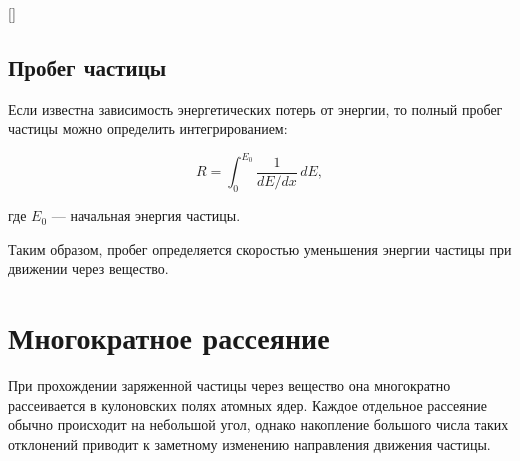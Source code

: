 \documentclass[../final.tex]{subfiles}
\begin{document}
\begin{rbox}[left=18pt,right=18pt,top=14pt,bottom=10pt]{[]}

    \captionsetup{
        font=footnotesize,
        labelfont=bf,
        skip=5pt
    }

    \label{fig:ionization_losses_particles}
\end{rbox}


\subsection{Пробег частицы}

Если известна зависимость энергетических потерь от энергии,
то полный пробег частицы можно определить интегрированием:

\begin{equation*}
    R
    =
    \int_0^{E_0}
    \frac{1}{dE/dx}\,dE,
\end{equation*}

где $E_0$ --- начальная энергия частицы.

Таким образом, пробег определяется скоростью уменьшения энергии
частицы при движении через вещество.


\section{Многократное рассеяние}

При прохождении заряженной частицы через вещество она многократно
рассеивается в кулоновских полях атомных ядер.
Каждое отдельное рассеяние обычно происходит на небольшой угол,
однако накопление большого числа таких отклонений приводит
к заметному изменению направления движения частицы.
\end{document}
